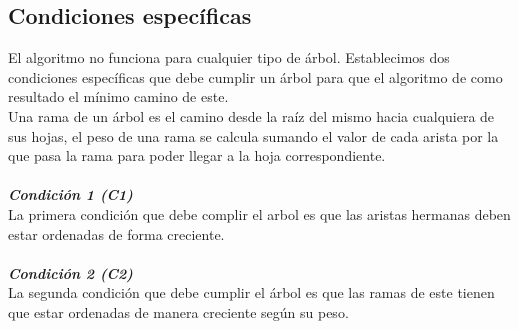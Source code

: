 \documentclass[10pt]{article}
\begin{document}
	\subsection*{Condiciones espec\'ificas}
	El algoritmo no funciona para cualquier tipo de \'arbol. Establecimos dos condiciones espec\'ificas que debe cumplir un \'arbol para que el algoritmo de como resultado el m\'inimo camino de este.
	\\
	Una rama de un \'arbol es el camino desde la ra\'iz del mismo hacia cualquiera de sus hojas, el peso de una rama se calcula sumando el valor de cada arista por la que pasa la rama para poder llegar a la hoja correspondiente.
	\\\\
	\textbf{\textit{Condici\'on 1 (C1)}}\\
	La primera condici\'on que debe complir el arbol es que las aristas hermanas deben estar ordenadas de forma creciente.
	\\\\
	\textbf{\textit{Condici\'on 2 (C2)}}\\
	La segunda condici\'on que debe cumplir el \'arbol es que las ramas de este tienen que estar ordenadas de manera creciente seg\'un su peso.
	\\\\
	
\end{document}
